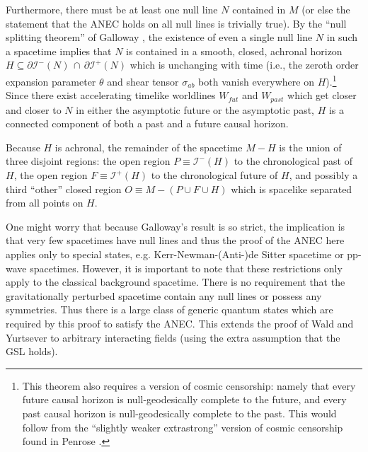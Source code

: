 \documentclass[11pt]{article}
\begin{document}
Furthermore, there must be at least one null line $N$ contained in $M$ (or else the statement that the ANEC holds on all null lines is trivially true).  By the ``null splitting theorem'' of Galloway \cite{galloway00}, the existence of even a single null line $N$ in such a spacetime implies that $N$ is contained in a smooth, closed, achronal horizon $H \subseteq \partial \mathcal{I}^-(N)\,\cap\,\partial \mathcal{I}^+(N)$ which is unchanging with time (i.e., the zeroth order expansion parameter $\theta$ and shear tensor $\sigma_{ab}$ both vanish everywhere on $H$).\footnote{This theorem also requires a version of cosmic censorship: namely that every future causal horizon is null-geodesically complete to the future, and every past causal horizon is null-geodesically complete to the past.  This would follow from the ``slightly weaker extrastrong'' version of cosmic censorship found in Penrose \cite{penrose99}.}  Since there exist accelerating timelike worldlines $W_{fut}$ and $W_{past}$ which get closer and closer to $N$ in either the asymptotic future or the asymptotic past, $H$ is a connected component of both a past and a future causal horizon.

Because $H$ is achronal, the remainder of the spacetime $M - H$ is the union of three disjoint regions: the open region $P \equiv \mathcal{I}^-(H)$ to the chronological past of $H$, the open region $F \equiv \mathcal{I}^+(H)$ to the chronological future of $H$, and possibly a third ``other'' closed region $O \equiv M - (P \cup F \cup H)$ which is spacelike separated from all points on $H$.

One might worry that because Galloway's result is so strict, the implication is that very few spacetimes have null lines and thus the proof of the ANEC here applies only to special states, e.g. Kerr-Newman-(Anti-)de Sitter spacetime or pp-wave spacetimes.  However, it is important to note that these restrictions only apply to the classical background spacetime.  There is no requirement that the gravitationally perturbed spacetime contain any null lines or possess any symmetries.  Thus there is a large class of generic quantum states which are required by this proof to satisfy the ANEC.  This extends the proof of Wald and Yurtsever \cite{WY91} to arbitrary interacting fields (using the extra assumption that the GSL holds).
\end{document}
